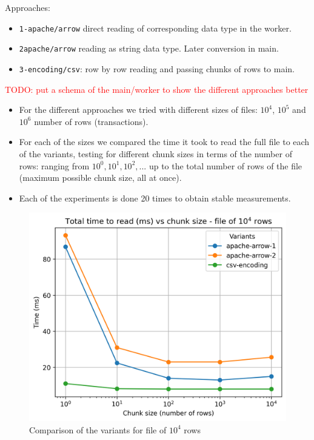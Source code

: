 Approaches:
\begin{itemize}
  \item \texttt{1-apache/arrow} direct reading of corresponding data type in the worker.
  \item \texttt{2apache/arrow} reading as string data type. Later conversion in main.
  \item \texttt{3-encoding/csv}: row by row reading and passing chunks of rows to main.
\end{itemize}

\textcolor{red}{TODO: put a schema of the main/worker to show the different approaches better}

\begin{itemize}
  \item For the different approaches we tried with different sizes of files: $10^4$, $10^5$ and $10^6$ number of rows (transactions).
  \item For each of the sizes we compared the time it took to read the full file to each of the variants, testing for different chunk sizes in terms of the number of rows: ranging from $10^0, 10^1, 10^2,...$ up to the total number of rows of the file (maximum possible chunk size, all at once).
  \item Each of the experiments is done 20 times to obtain stable measurements.
\end{itemize}


\begin{figure}[H]
  \centering
  \includegraphics[scale = 0.7]{images/4-Experiments/read-input-10-4.png}
  \caption{Comparison of the variants for file of $10^4$ rows}
\end{figure}

